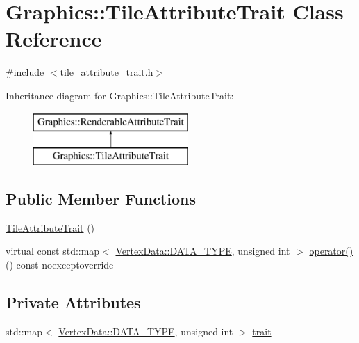 \hypertarget{class_graphics_1_1_tile_attribute_trait}{}\section{Graphics\+:\+:Tile\+Attribute\+Trait Class Reference}
\label{class_graphics_1_1_tile_attribute_trait}


{\ttfamily \#include $<$tile\+\_\+attribute\+\_\+trait.\+h$>$}

Inheritance diagram for Graphics\+:\+:Tile\+Attribute\+Trait\+:\begin{figure}[H]
\begin{center}
\leavevmode
\includegraphics[height=2.000000cm]{class_graphics_1_1_tile_attribute_trait}
\end{center}
\end{figure}
\subsection*{Public Member Functions}
\begin{DoxyCompactItemize}
\item 
\hyperlink{class_graphics_1_1_tile_attribute_trait_a8271798aeb430ac5cf3dc1a0c73175fd}{Tile\+Attribute\+Trait} ()
\item 
virtual const std\+::map$<$ \hyperlink{class_graphics_1_1_vertex_data_a50e88236939dc2a3ec4df7aeb728620e}{Vertex\+Data\+::\+D\+A\+T\+A\+\_\+\+T\+Y\+P\+E}, unsigned int $>$ \hyperlink{class_graphics_1_1_tile_attribute_trait_a5c217a080f9b52799ad6c9e2ffaa06f5}{operator()} () const noexceptoverride
\end{DoxyCompactItemize}
\subsection*{Private Attributes}
\begin{DoxyCompactItemize}
\item 
std\+::map$<$ \hyperlink{class_graphics_1_1_vertex_data_a50e88236939dc2a3ec4df7aeb728620e}{Vertex\+Data\+::\+D\+A\+T\+A\+\_\+\+T\+Y\+P\+E}, unsigned int $>$ \hyperlink{class_graphics_1_1_tile_attribute_trait_a207820d288507ca70df8f95d7fdd04db}{trait}
\end{DoxyCompactItemize}


